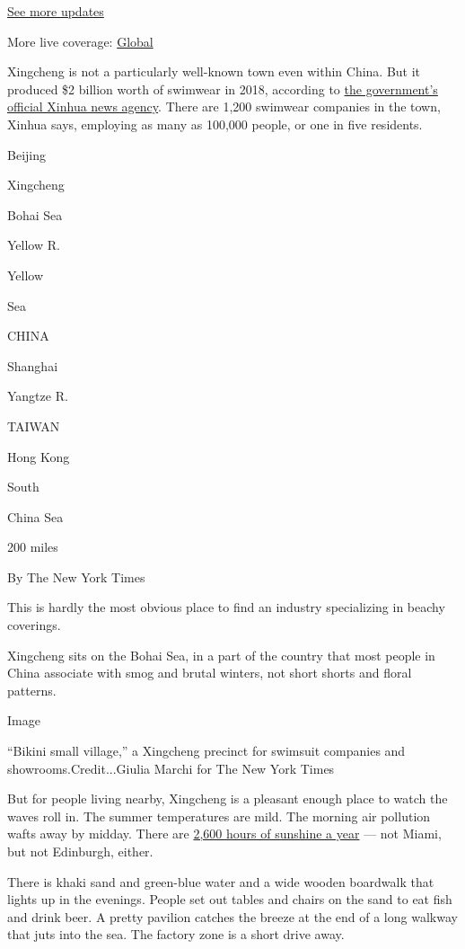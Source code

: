 \href{https://www.nytimes.com/live/2020/07/31/business/stock-market-today-coronavirus?action=click\&pgtype=Article\&state=default\&region=MAIN_CONTENT_1\&context=storylines_live_updates}{See
more updates}

More live coverage:
\href{https://www.nytimes.com/2020/08/01/world/coronavirus-covid-19.html?action=click\&pgtype=Article\&state=default\&region=MAIN_CONTENT_1\&context=storylines_live_updates}{Global}

Xingcheng is not a particularly well-known town even within China. But
it produced \$2 billion worth of swimwear in 2018, according to
\href{http://www.xinhuanet.com/2019-07/05/c_1124716951.htm}{the
government's official Xinhua news agency}. There are 1,200 swimwear
companies in the town, Xinhua says, employing as many as 100,000 people,
or one in five residents.

Beijing

Xingcheng

Bohai Sea

Yellow R.

Yellow

Sea

CHINA

Shanghai

Yangtze R.

TAIWAN

Hong Kong

South

China Sea

200 miles

By The New York Times

This is hardly the most obvious place to find an industry specializing
in beachy coverings.

Xingcheng sits on the Bohai Sea, in a part of the country that most
people in China associate with smog and brutal winters, not short shorts
and floral patterns.

Image

``Bikini small village,'' a Xingcheng precinct for swimsuit companies
and showrooms.Credit...Giulia Marchi for The New York Times

But for people living nearby, Xingcheng is a pleasant enough place to
watch the waves roll in. The summer temperatures are mild. The morning
air pollution wafts away by midday. There are
\href{http://www.weather.com.cn/cityintro/101071401.shtml}{2,600 hours
of sunshine a year} --- not Miami, but not Edinburgh, either.

There is khaki sand and green-blue water and a wide wooden boardwalk
that lights up in the evenings. People set out tables and chairs on the
sand to eat fish and drink beer. A pretty pavilion catches the breeze at
the end of a long walkway that juts into the sea. The factory zone is a
short drive away.

